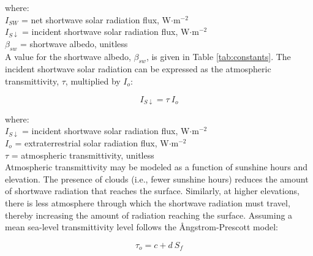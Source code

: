 \noindent where: \\
\indent $I_{SW}$ = net shortwave solar radiation flux, W$\cdot$m$^{-2}$ \\
\indent $I_{S\downarrow}$ = incident shortwave solar radiation flux, W$\cdot$m$^{-2}$ \\
\indent $\beta_{sw}$ = shortwave albedo, unitless \\

\noindent A value for the shortwave albedo, $\beta_{sw}$, is given in Table \ref{tab:constants}. 
The incident shortwave solar radiation can be expressed as the atmospheric transmittivity, $\tau$, multiplied by $I_o$:

\begin{equation}
\label{eq:rs}
	I_{S\downarrow} = \tau\: I_o
\end{equation}

\noindent where: \\
\indent $I_{S\downarrow}$ = incident shortwave solar radiation flux, W$\cdot$m$^{-2}$ \\
\indent $I_o$ = extraterrestrial solar radiation flux, W$\cdot$m$^{-2}$ \\
\indent $\tau$ = atmospheric transmittivity, unitless \\

Atmospheric transmittivity may be modeled as a function of sunshine hours and elevation. 
The presence of clouds (i.e., fewer sunshine hours) reduces the amount of shortwave radiation that reaches the surface. 
Similarly, at higher elevations, there is less atmosphere through which the shortwave radiation must travel, thereby increasing the amount of radiation reaching the surface. 
Assuming a mean sea-level transmittivity level follows the \r{A}ngstrom-Prescott model:

\begin{equation}
\label{eq:tauo}
	\tau_o = c + d\: S_f 
\end{equation}

